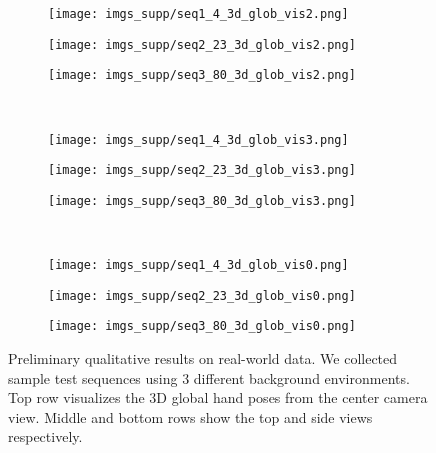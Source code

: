 \documentclass[10pt,twocolumn,letterpaper]{article}
\begin{document}
\begin{figure*}[h]
  \begin{subfigure}[t]{0.32\linewidth}
    \texttt{[image: imgs\_supp/seq1\_4\_3d\_glob\_vis2.png]}
  \end{subfigure}
  \begin{subfigure}[t]{0.32\linewidth}
    \texttt{[image: imgs\_supp/seq2\_23\_3d\_glob\_vis2.png]}
  \end{subfigure}
  \begin{subfigure}[t]{0.32\linewidth}
    \texttt{[image: imgs\_supp/seq3\_80\_3d\_glob\_vis2.png]}
  \end{subfigure}\\
  \begin{subfigure}[t]{0.32\linewidth}
    \texttt{[image: imgs\_supp/seq1\_4\_3d\_glob\_vis3.png]}
  \end{subfigure}
  \begin{subfigure}[t]{0.32\linewidth}
    \texttt{[image: imgs\_supp/seq2\_23\_3d\_glob\_vis3.png]}
  \end{subfigure}
  \begin{subfigure}[t]{0.32\linewidth}
    \texttt{[image: imgs\_supp/seq3\_80\_3d\_glob\_vis3.png]}
  \end{subfigure}\\
  \begin{subfigure}[t]{0.32\linewidth}
    \texttt{[image: imgs\_supp/seq1\_4\_3d\_glob\_vis0.png]}
  \end{subfigure}
  \begin{subfigure}[t]{0.32\linewidth}
    \texttt{[image: imgs\_supp/seq2\_23\_3d\_glob\_vis0.png]}
  \end{subfigure}
  \begin{subfigure}[t]{0.32\linewidth}
    \texttt{[image: imgs\_supp/seq3\_80\_3d\_glob\_vis0.png]}
  \end{subfigure}
  \vspace{0.2cm}
  \caption{Preliminary qualitative results on real-world data. We collected sample test sequences using 3 different background environments. Top row visualizes the 3D global hand poses from the center camera view. Middle and bottom rows show the top and side views respectively.}
  \label{fig:qualitative_results1}
\end{figure*}
\end{document}
